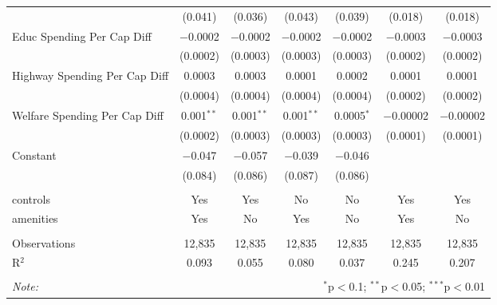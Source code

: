 \begin{table}[!htbp]
\begin{tabular}{@{\extracolsep{5pt}}lcccccc}
  & (0.041) & (0.036) & (0.043) & (0.039) & (0.018) & (0.018) \\ 
  Educ Spending Per Cap Diff & $-$0.0002 & $-$0.0002 & $-$0.0002 & $-$0.0002 & $-$0.0003 & $-$0.0003 \\ 
  & (0.0002) & (0.0003) & (0.0003) & (0.0003) & (0.0002) & (0.0002) \\ 
  Highway Spending Per Cap Diff & 0.0003 & 0.0003 & 0.0001 & 0.0002 & 0.0001 & 0.0001 \\ 
  & (0.0004) & (0.0004) & (0.0004) & (0.0004) & (0.0002) & (0.0002) \\ 
  Welfare Spending Per Cap Diff & 0.001$^{**}$ & 0.001$^{**}$ & 0.001$^{**}$ & 0.0005$^{*}$ & $-$0.00002 & $-$0.00002 \\ 
  & (0.0002) & (0.0003) & (0.0003) & (0.0003) & (0.0001) & (0.0001) \\ 
  Constant & $-$0.047 & $-$0.057 & $-$0.039 & $-$0.046 &  &  \\ 
  & (0.084) & (0.086) & (0.087) & (0.086) &  &  \\ 
 \hline \\[-1.8ex] 
controls & Yes & Yes & No & No & Yes & Yes \\ 
amenities & Yes & No & Yes & No & Yes & No \\ 
\hline \\[-1.8ex] 
Observations & 12,835 & 12,835 & 12,835 & 12,835 & 12,835 & 12,835 \\ 
R$^{2}$ & 0.093 & 0.055 & 0.080 & 0.037 & 0.245 & 0.207 \\ 
\hline 
\hline \\[-1.8ex] 
\textit{Note:}  & \multicolumn{6}{r}{$^{*}$p$<$0.1; $^{**}$p$<$0.05; $^{***}$p$<$0.01} \\ 
\end{tabular} 
\end{table} 
